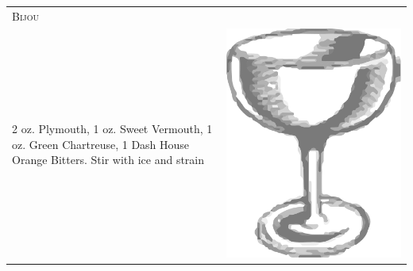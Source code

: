 \documentclass{article}
\begin{document}
\begin{tabular}{p{2in} p{0.5in}}
	\multicolumn{2}{p{3in}}{\centering\Huge\textsc{Bijou}}\\ 
	  \vspace{-0.1in}2 oz. Plymouth, 1 oz. Sweet Vermouth, 1 oz. Green Chartreuse, 1 Dash House Orange Bitters. Stir with ice and strain &
	  \vspace{-0.1in} \includegraphics{egg_coupe.png}
\end{tabular}\\
\end{document}
